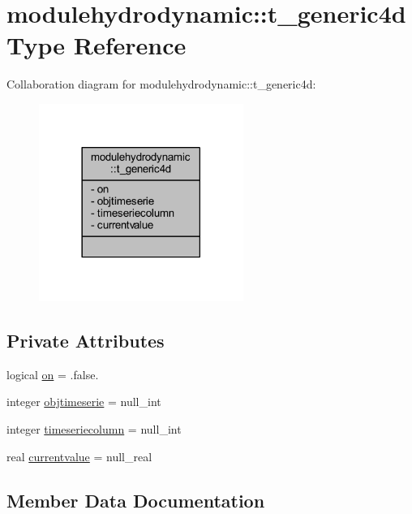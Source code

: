 \hypertarget{structmodulehydrodynamic_1_1t__generic4d}{}\section{modulehydrodynamic\+:\+:t\+\_\+generic4d Type Reference}
\label{structmodulehydrodynamic_1_1t__generic4d}


Collaboration diagram for modulehydrodynamic\+:\+:t\+\_\+generic4d\+:\nopagebreak
\begin{figure}[H]
\begin{center}
\leavevmode
\includegraphics[width=189pt]{structmodulehydrodynamic_1_1t__generic4d__coll__graph}
\end{center}
\end{figure}
\subsection*{Private Attributes}
\begin{DoxyCompactItemize}
\item 
logical \mbox{\hyperlink{structmodulehydrodynamic_1_1t__generic4d_ac35b4a9790336dbbe41376a64fbe74a4}{on}} = .false.
\item 
integer \mbox{\hyperlink{structmodulehydrodynamic_1_1t__generic4d_ab11dae2f03379862423d1cbfd298da79}{objtimeserie}} = null\+\_\+int
\item 
integer \mbox{\hyperlink{structmodulehydrodynamic_1_1t__generic4d_ad7aba6f6d15b85be1b0847d871b2dee1}{timeseriecolumn}} = null\+\_\+int
\item 
real \mbox{\hyperlink{structmodulehydrodynamic_1_1t__generic4d_a3c1ba0793bd448427df98cb26aedba15}{currentvalue}} = null\+\_\+real
\end{DoxyCompactItemize}


\subsection{Member Data Documentation}
\mbox{\label{structmodulehydrodynamic_1_1t__generic4d_a3c1ba0793bd448427df98cb26aedba15}} 

